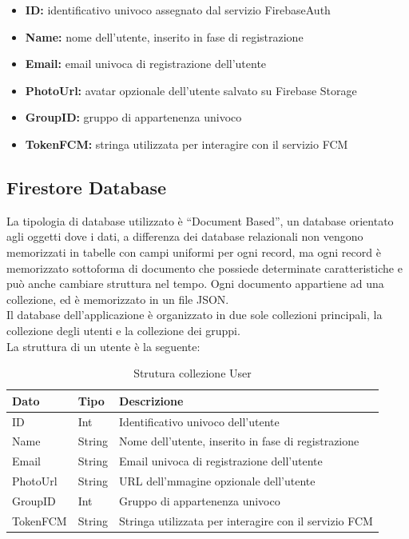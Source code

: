 \begin{itemize}
    \item \textbf{ID:}  identificativo univoco assegnato dal servizio FirebaseAuth
    \item \textbf{Name:} nome dell'utente, inserito in fase di registrazione
    \item \textbf{Email:} email univoca di registrazione dell'utente
    \item \textbf{PhotoUrl:} avatar opzionale dell'utente salvato su Firebase Storage
    \item \textbf{GroupID:} gruppo di appartenenza univoco
    \item \textbf{TokenFCM:} stringa utilizzata per interagire con il servizio FCM
\end{itemize}

\newpage



\subsection{Firestore Database}
La tipologia di database utilizzato è ``Document Based'', un database orientato agli oggetti dove i dati, a differenza dei database relazionali non vengono memorizzati in tabelle con campi uniformi per ogni record, ma ogni record è memorizzato sottoforma di documento che possiede determinate caratteristiche e può anche cambiare struttura nel tempo. Ogni documento appartiene ad una collezione, ed è memorizzato in un file JSON.\\
Il database dell'applicazione è organizzato in due sole collezioni principali, la collezione degli utenti e la collezione dei gruppi.\\
La struttura di un utente è la seguente:

\begin{table}[h]
\begin{center}
\begin{tabular}{|l|l|l|}
    \hline
\textbf{Dato} & \textbf{Tipo}  & \textbf{Descrizione}\\ \hline
ID & Int & Identificativo univoco dell'utente \\\hline
Name & String & Nome dell'utente, inserito in fase di registrazione \\ \hline
Email & String & Email univoca di registrazione dell'utente \\ \hline
PhotoUrl & String & URL dell'mmagine opzionale dell'utente \\ \hline
GroupID & Int &  Gruppo di appartenenza univoco \\ \hline
TokenFCM & String & Stringa utilizzata per interagire con il servizio FCM \\
\hline
\end{tabular}
\caption[Dati Firestore]{Strutura collezione User}\label{tab:Strutture collezione User}
\end{center}
\end{table}

